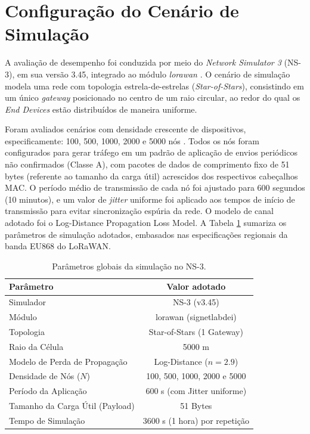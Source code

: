 \section{Configuração do Cenário de Simulação}

A avaliação de desempenho foi conduzida por meio do \textit{Network Simulator 3} (NS-3), em sua versão 3.45, integrado ao módulo \textit{lorawan} \cite{signetlabdei}. O cenário de simulação modela uma rede com topologia estrela-de-estrelas (\textit{Star-of-Stars}), consistindo em um único \textit{gateway} posicionado no centro de um raio circular, ao redor do qual os \textit{End Devices} estão distribuídos de maneira uniforme.

Foram avaliados cenários com densidade crescente de dispositivos, especificamente: 100, 500, 1000, 2000 e 5000 nós \cite{Jain1991}. Todos os nós foram configurados para gerar tráfego em um padrão de aplicação de envios periódicos não confirmados (Classe A), com pacotes de dados de comprimento fixo de 51 bytes (referente ao tamanho da carga útil) acrescidos dos respectivos cabeçalhos MAC. O período médio de transmissão de cada nó foi ajustado para 600 segundos (10 minutos), e um valor de \textit{jitter} uniforme foi aplicado aos tempos de início de transmissão para evitar sincronização espúria da rede. O modelo de canal adotado foi o Log-Distance Propagation Loss Model. A Tabela \ref{tab:parametros} sumariza os parâmetros de simulação adotados, embasados nas especificações regionais da banda EU868 do LoRaWAN.

\begin{table}[htb]
\caption{\label{tab:parametros}Parâmetros globais da simulação no NS-3.}
\centering
\begin{tabular}{|l|c|}
\hline
\rowcolor[HTML]{C0C0C0}
\textbf{Parâmetro} & \textbf{Valor adotado} \\ \hline
Simulador & NS-3 (v3.45) \\ \hline
Módulo & lorawan (signetlabdei) \\ \hline
Topologia & Star-of-Stars (1 Gateway) \\ \hline
Raio da Célula & 5000 m \\ \hline
Modelo de Perda de Propagação & Log-Distance ($n = 2.9$) \\ \hline
Densidade de Nós ($N$) & 100, 500, 1000, 2000 e 5000 \\ \hline
Período da Aplicação & 600 s (com Jitter uniforme) \\ \hline
Tamanho da Carga Útil (Payload) & 51 Bytes \\ \hline
Tempo de Simulação & 3600 s (1 hora) por repetição \\ \hline
\end{tabular}
\end{table}

